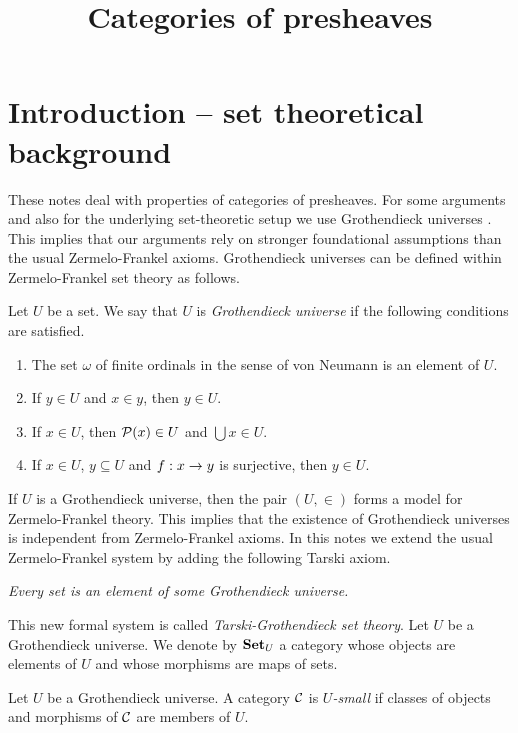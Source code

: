 



\title{Categories of presheaves}
\date{}
\maketitle

\section{Introduction -- set theoretical background}\label{section:introduction}
\noindent
These notes deal with properties of categories of presheaves. For some arguments and also for the underlying set-theoretic setup we use Grothendieck universes {\cite[page 22]{Maclane}}. This implies that our arguments rely on stronger foundational assumptions than the usual Zermelo-Frankel axioms. Grothendieck universes can be defined within Zermelo-Frankel set theory as follows.

\begin{definition}
Let $U$ be a set. We say that $U$ is \textit{Grothendieck universe} if the following conditions are satisfied.
\begin{enumerate}[label=\textbf{(\arabic*)}, leftmargin=1.5em]
\item The set $\omega$ of finite ordinals in the sense of von Neumann is an element of $U$.
\item If $y\in U$ and $x\in y$, then $y\in U$.
\item If $x\in U$, then ${\mathcal P}(x)\in U$ and $\bigcup x\in U$.
\item If $x\in U$, $y\subseteq U$ and $f:x\rightarrow y$ is surjective, then $y\in U$.
\end{enumerate}
\end{definition}
\noindent
If $U$ is a Grothendieck universe, then the pair $(U,\in)$ forms a model for Zermelo-Frankel theory. This implies that the existence of Grothendieck universes is independent from Zermelo-Frankel axioms. In this notes we extend the usual Zermelo-Frankel system by adding the following Tarski axiom.
\begin{center}
\textit{Every set is an element of some Grothendieck universe.}
\end{center}
This new formal system is called \textit{Tarski-Grothendieck set theory}. Let $U$ be a Grothendieck universe. We denote by $\mathbf{Set}_U$ a category whose objects are elements of $U$ and whose morphisms are maps of sets. 

\begin{definition}
Let $U$ be a Grothendieck universe. A category ${\mathcal C}$ is \textit{$U$-small} if classes of objects and morphisms of ${\mathcal C}$ are members of $U$.
\end{definition}

